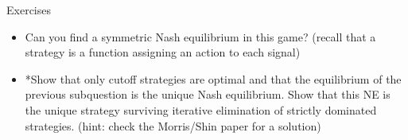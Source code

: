 \documentclass[bigger,allowframebreaks]{beamer}
\begin{document}
\begin{frame}[allowframebreaks,label=]{Exercises}
\begin{itemize}
\end{itemize}
\begin{itemize}
\item Can you find a symmetric Nash equilibrium in this game? (recall that a strategy is a function assigning an action to each signal)
\end{itemize}
\begin{itemize}
\item *Show that only cutoff strategies are optimal and that the equilibrium of the previous subquestion is the unique Nash equilibrium. Show that this NE is the unique strategy surviving iterative elimination of strictly dominated strategies. (hint: check the Morris/Shin paper for a solution)
\end{itemize}
\end{frame}
\end{document}

